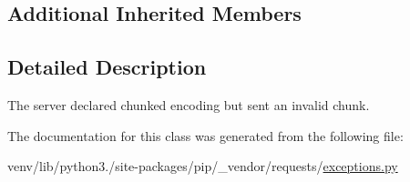 \subsection*{Additional Inherited Members}


\subsection{Detailed Description}
\begin{DoxyVerb}The server declared chunked encoding but sent an invalid chunk.\end{DoxyVerb}
 

The documentation for this class was generated from the following file\+:\begin{DoxyCompactItemize}
\item 
venv/lib/python3./site-\/packages/pip/\+\_\+vendor/requests/\hyperlink{pip_2__vendor_2requests_2exceptions_8py}{exceptions.\+py}\end{DoxyCompactItemize}
